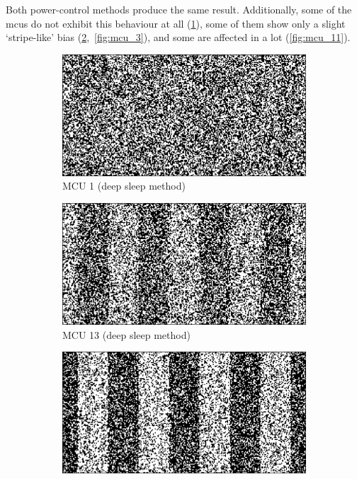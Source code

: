 Both power-control methods produce the same result. Additionally, some of the \glspl{mcu} do not exhibit this behaviour at all (\ref{fig:mcu_1}), some of them show only a slight `stripe-like' bias (\ref{fig:mcu_13},~\ref{fig:mcu_3}), and some are affected in a lot (\ref{fig:mcu_11}).

\begin{figure}[ht!]
        \centering
        \captionsetup{justification=centering,margin=0.5cm}
        \begin{subfigure}[b]{0.475\textwidth}
            \centering
            \includegraphics[width=\textwidth]{images/1_response_sleep.png}
            \caption{MCU 1 (deep sleep method)}    
            \label{fig:mcu_1}
        \end{subfigure}
        \hfill
        \begin{subfigure}[b]{0.475\textwidth}  
            \centering 
            \includegraphics[width=\textwidth]{images/13_response_sleep.png}
            \caption{MCU 13 (deep sleep method)}    
            \label{fig:mcu_13}
        \end{subfigure}
        \vskip 1.75mm
        \begin{subfigure}[b]{0.475\textwidth}   
            \centering 
            \includegraphics[width=\textwidth]{images/11_response_rtc.png}

\end{subfigure}
\end{figure}
